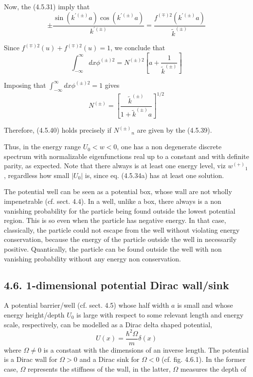 \documentclass{article}
\begin{document}
Now, the (4.5.31) imply that
$$
\begin{equation*}
\pm \frac{\sin \left(k^{\prime( \pm)} a\right) \cos \left(k^{\prime( \pm)} a\right)}{k^{\prime( \pm)}}=\frac{f^{(\mp) 2}\left(k^{\prime( \pm)} a\right)}{\tilde{k}^{( \pm)}} \tag{4.5.47}
\end{equation*}
$$

Since $f^{(\mp) 2}(u)+f^{(\mp) 2}(u)=1$, we conclude that
$$
\begin{equation*}
\int_{-\infty}^{\infty} d x \phi^{( \pm) 2}=N^{( \pm) 2}\left[a+\frac{1}{\tilde{k}^{( \pm)}}\right] \tag{4.5.48}
\end{equation*}
$$

Imposing that $\int_{-\infty}^{\infty} d x \phi^{( \pm) 2}=1$ gives
$$
\begin{equation*}
N^{( \pm)}=\left[\frac{\tilde{k}^{( \pm)}}{1+\tilde{k}^{( \pm)} a}\right]^{1 / 2} \tag{4.5.49}
\end{equation*}
$$

Therefore, (4.5.40) holds precisely if $N^{( \pm)}{ }_{n}$ are given by the (4.5.39).

Thus, in the energy range $U_{0}<w<0$, one has a non degenerate discrete spectrum with normalizable eigenfunctions real up to a constant and with definite parity, as expected. Note that there always is at least one energy level, viz $w^{(+)}{ }_{1}$, regardless how small $\left|U_{0}\right|$ is, since eq. (4.5.34a) has at least one solution.

The potential well can be seen as a potential box, whose wall are not wholly impenetrable (cf. sect. 4.4). In a well, unlike a box, there always is a non vanishing probability for the particle being found outside the lowest potential region. This is so even when the particle has negative energy. In that case, classically, the particle could not escape from the well without violating energy conservation, because the energy of the particle outside the well in necessarily positive. Quantically, the particle can be found outside the well with non vanishing probability without any energy non conservation.

\subsection*{4.6. 1-dimensional potential Dirac wall/sink}

A potential barrier/well (cf. sect. 4.5) whose half width $a$ is small and whose energy height/depth $U_{0}$ is large with respect to some relevant length and energy scale, respectively, can be modelled as a Dirac delta shaped potential,
$$
\begin{equation*}
U(x)=\frac{\hbar^{2} \Omega}{m} \delta(x) \tag{4.6.1}
\end{equation*}
$$
where $\Omega \neq 0$ is a constant with the dimensions of an inverse length. The potential is a Dirac wall for $\Omega>0$ and a Dirac sink for $\Omega<0$ (cf. fig. 4.6.1). In the former case, $\Omega$ represents the stiffness of the wall, in the latter, $\Omega$ measures the depth of
\end{document}
